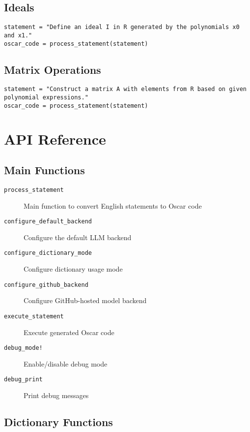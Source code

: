 \documentclass[11pt,a4paper]{article}
\begin{document}
\subsection{Ideals}

\begin{lstlisting}
statement = "Define an ideal I in R generated by the polynomials x0 and x1."
oscar_code = process_statement(statement)
\end{lstlisting}

\subsection{Matrix Operations}

\begin{lstlisting}
statement = "Construct a matrix A with elements from R based on given polynomial expressions."
oscar_code = process_statement(statement)
\end{lstlisting}

\section{API Reference}

\subsection{Main Functions}

\begin{description}
    \item[\texttt{process\_statement}] Main function to convert English statements to Oscar code
    \item[\texttt{configure\_default\_backend}] Configure the default LLM backend
    \item[\texttt{configure\_dictionary\_mode}] Configure dictionary usage mode
    \item[\texttt{configure\_github\_backend}] Configure GitHub-hosted model backend
    \item[\texttt{execute\_statement}] Execute generated Oscar code
    \item[\texttt{debug\_mode!}] Enable/disable debug mode
    \item[\texttt{debug\_print}] Print debug messages
\end{description}

\subsection{Dictionary Functions}
\end{document}
